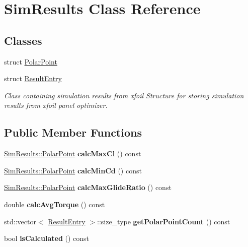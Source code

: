 \hypertarget{class_sim_results}{}\section{Sim\+Results Class Reference}
\label{class_sim_results}
\subsection*{Classes}
\begin{DoxyCompactItemize}
\item 
struct \hyperlink{struct_sim_results_1_1_polar_point}{Polar\+Point}
\item 
struct \hyperlink{struct_sim_results_1_1_result_entry}{Result\+Entry}
\begin{DoxyCompactList}\small\item\em Class containing simulation results from xfoil Structure for storing simulation results from xfoil panel optimizer. \end{DoxyCompactList}\end{DoxyCompactItemize}
\subsection*{Public Member Functions}
\begin{DoxyCompactItemize}
\item 
\mbox{\label{class_sim_results_a97d9aea7827178c953e17376901b25c3}} 
\hyperlink{struct_sim_results_1_1_polar_point}{Sim\+Results\+::\+Polar\+Point} {\bfseries calc\+Max\+Cl} () const
\item 
\mbox{\label{class_sim_results_a9db449a60b4fc5f2a42660782e45132e}} 
\hyperlink{struct_sim_results_1_1_polar_point}{Sim\+Results\+::\+Polar\+Point} {\bfseries calc\+Min\+Cd} () const
\item 
\mbox{\label{class_sim_results_a25e2cd441dbd6f0c6717ec6db353e8ca}} 
\hyperlink{struct_sim_results_1_1_polar_point}{Sim\+Results\+::\+Polar\+Point} {\bfseries calc\+Max\+Glide\+Ratio} () const
\item 
\mbox{\label{class_sim_results_ae4f3545964f3c40499807b5ae791d6d9}} 
double {\bfseries calc\+Avg\+Torque} () const
\item 
\mbox{\label{class_sim_results_aa563c82a06085dc2c4b49a8f8a6b223e}} 
std\+::vector$<$ \hyperlink{struct_sim_results_1_1_result_entry}{Result\+Entry} $>$\+::size\+\_\+type {\bfseries get\+Polar\+Point\+Count} () const
\item 
\mbox{\label{class_sim_results_af8fba1ae854fd4163d505076e3e73a2e}} 
bool {\bfseries is\+Calculated} () const
\end{DoxyCompactItemize}
